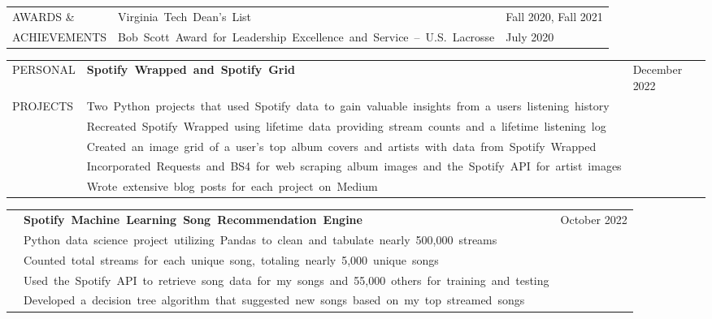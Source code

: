 \documentclass[12pt, letter]{book}
\begin{document}

\vspace{10mm}

\noindent
\begin{tabular}{@{}>{\raggedright\arraybackslash}p{3.5cm}@{}p{5cm}@{}>{\raggedleft\arraybackslash}p{10.5cm}@{}}
    \footnotesize {AWARDS \& } & {\footnotesize\mbox{Virginia Tech Dean’s List}} & \footnotesize {Fall 2020, Fall 2021} \\
    \footnotesize {ACHIEVEMENTS} & {\footnotesize\mbox{Bob Scott Award for Leadership Excellence and Service – U.S. Lacrosse}} & \footnotesize {July 2020} \\
\end{tabular}

\vspace{10mm}



\noindent
\begin{tabular}{@{}>{\raggedright\arraybackslash}p{3.5cm}@{}p{5cm}@{}>{\raggedleft\arraybackslash}p{10.5cm}@{}}
    \footnotesize {PERSONAL} & \textbf{\footnotesize\mbox{Spotify Wrapped and Spotify Grid}} & \footnotesize {December 2022} \\
    \footnotesize {PROJECTS} & {\footnotesize\mbox{Two Python projects that used Spotify data to gain valuable insights from a users listening history}} \\
    & {\footnotesize\mbox{Recreated Spotify Wrapped using lifetime data providing stream counts and a lifetime listening log}} \\
    & {\footnotesize\mbox{Created an image grid of a user's top album covers and artists with data from Spotify Wrapped}} \\
    & {\footnotesize\mbox{Incorporated Requests and BS4 for web scraping album images and the Spotify API for artist images}} \\
    & {\footnotesize\mbox{Wrote extensive blog posts for each project on Medium}} \\
\end{tabular}

\vspace{4mm}
    
\noindent
\begin{tabular}{@{}>{\raggedright\arraybackslash}p{3.5cm}@{}p{5cm}@{}>{\raggedleft\arraybackslash}p{10.5cm}@{}}
    & \textbf{\footnotesize\mbox{Spotify Machine Learning Song Recommendation Engine}} & \footnotesize {October 2022} \\
    & {\footnotesize\mbox{Python data science project utilizing Pandas to clean and tabulate nearly 500,000 streams}} \\
    & {\footnotesize\mbox{Counted total streams for each unique song, totaling nearly 5,000 unique songs}} \\
    & {\footnotesize\mbox{Used the Spotify API to retrieve song data for my songs and 55,000 others for training and testing}} \\
    & {\footnotesize\mbox{Developed a decision tree algorithm that suggested new songs based on my top streamed songs}}
\end{tabular}
\end{document}
